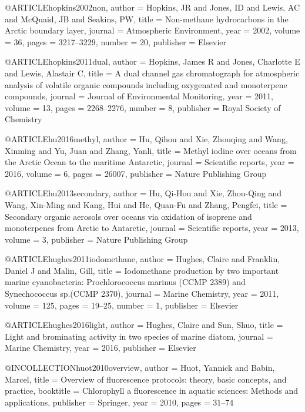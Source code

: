 @ARTICLE{hopkins2002non,
  author = {Hopkins, JR and Jones, ID and Lewis, AC and McQuaid, JB and Seakins,
	PW},
  title = {Non-methane hydrocarbons in the Arctic boundary layer},
  journal = {Atmospheric Environment},
  year = {2002},
  volume = {36},
  pages = {3217--3229},
  number = {20},
  publisher = {Elsevier}
}

@ARTICLE{hopkins2011dual,
  author = {Hopkins, James R and Jones, Charlotte E and Lewis, Alastair C},
  title = {A dual channel gas chromatograph for atmospheric analysis of volatile
	organic compounds including oxygenated and monoterpene compounds},
  journal = {Journal of Environmental Monitoring},
  year = {2011},
  volume = {13},
  pages = {2268--2276},
  number = {8},
  publisher = {Royal Society of Chemistry}
}

@ARTICLE{hu2016methyl,
  author = {Hu, Qihou and Xie, Zhouqing and Wang, Xinming and Yu, Juan and Zhang,
	Yanli},
  title = {Methyl iodine over oceans from the Arctic Ocean to the maritime Antarctic},
  journal = {Scientific reports},
  year = {2016},
  volume = {6},
  pages = {26007},
  publisher = {Nature Publishing Group}
}

@ARTICLE{hu2013secondary,
  author = {Hu, Qi-Hou and Xie, Zhou-Qing and Wang, Xin-Ming and Kang, Hui and
	He, Quan-Fu and Zhang, Pengfei},
  title = {Secondary organic aerosols over oceans via oxidation of isoprene
	and monoterpenes from Arctic to Antarctic},
  journal = {Scientific reports},
  year = {2013},
  volume = {3},
  publisher = {Nature Publishing Group}
}

@ARTICLE{hughes2011iodomethane,
  author = {Hughes, Claire and Franklin, Daniel J and Malin, Gill},
  title = {Iodomethane production by two important marine cyanobacteria: Prochlorococcus
	marinus (CCMP 2389) and Synechococcus sp.(CCMP 2370)},
  journal = {Marine Chemistry},
  year = {2011},
  volume = {125},
  pages = {19--25},
  number = {1},
  publisher = {Elsevier}
}

@ARTICLE{hughes2016light,
  author = {Hughes, Claire and Sun, Shuo},
  title = {Light and brominating activity in two species of marine diatom},
  journal = {Marine Chemistry},
  year = {2016},
  publisher = {Elsevier}
}

@INCOLLECTION{huot2010overview,
  author = {Huot, Yannick and Babin, Marcel},
  title = {Overview of fluorescence protocols: theory, basic concepts, and practice},
  booktitle = {Chlorophyll a fluorescence in aquatic sciences: Methods and applications},
  publisher = {Springer},
  year = {2010},
  pages = {31--74}
}

